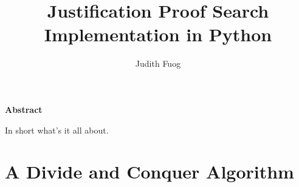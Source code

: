\documentclass[a4paper]{report}
\begin{document}
\pagestyle{fancyplain} \thispagestyle{empty}

\title{Justification Proof Search Implementation in Python}
\author{Judith Fuog}


 \setcounter{page}{1}
\maketitle

\newpage
\thispagestyle{empty}
\vspace{8cm}
\noindent
{\centerline {\bf \large Abstract}}
\vspace{1cm}

\noindent In short what's it all about.

 \setcounter{page}{1}
\tableofcontents

%
%
%

\newpage{\pagestyle{empty} \cleardoublepage}

 \setcounter{page}{1}
\pagestyle{fancy}





\newpage{\pagestyle{empty} \cleardoublepage}
\chapter{A Divide and Conquer Algorithm}
\label{chap: Algorithm A Divide and Conquer Approach}






%
%
%


 

{}


%
\nocite{*}

\newpage{\pagestyle{empty} \cleardoublepage}
\listoftodos
\end{document}
